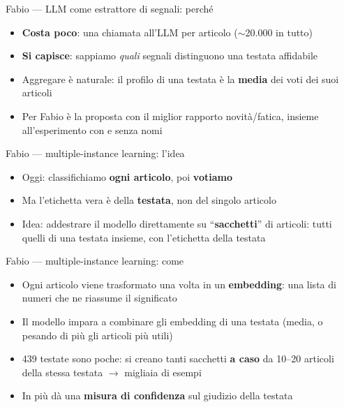\documentclass[aspectratio=169]{beamer}
\newcommand{\hl}[1]{\textbf{#1}}
\begin{document}
\begin{frame}{Fabio --- LLM come estrattore di segnali: perch\'e}
  \vfill
  \begin{itemize}[<+->]
    \setlength\itemsep{0.8em}
    \item \hl{Costa poco}: una chiamata all'LLM per articolo ($\sim$20.000 in tutto)
    \item \hl{Si capisce}: sappiamo \emph{quali} segnali distinguono una testata affidabile
    \item Aggregare \`e naturale: il profilo di una testata \`e la \hl{media} dei voti dei suoi articoli
    \item Per Fabio \`e la proposta con il miglior rapporto novit\`a/fatica, insieme all'esperimento con e senza nomi
  \end{itemize}
  \vfill
\end{frame}

\begin{frame}{Fabio --- multiple-instance learning: l'idea}
  \vfill
  \begin{itemize}[<+->]
    \setlength\itemsep{0.8em}
    \item Oggi: classifichiamo \hl{ogni articolo}, poi \hl{votiamo}
    \item Ma l'etichetta vera \`e della \hl{testata}, non del singolo articolo
    \item Idea: addestrare il modello direttamente su ``\hl{sacchetti}'' di articoli: tutti quelli di una testata insieme, con l'etichetta della testata
  \end{itemize}
  \vfill
\end{frame}

\begin{frame}{Fabio --- multiple-instance learning: come}
  \vfill
  \begin{itemize}[<+->]
    \setlength\itemsep{0.8em}
    \item Ogni articolo viene trasformato una volta in un \hl{embedding}: una lista di numeri che ne riassume il significato
    \item Il modello impara a combinare gli embedding di una testata (media, o pesando di pi\`u gli articoli pi\`u utili)
    \item 439 testate sono poche: si creano tanti sacchetti \hl{a caso} da 10--20 articoli della stessa testata $\rightarrow$ migliaia di esempi
    \item In pi\`u d\`a una \hl{misura di confidenza} sul giudizio della testata
  \end{itemize}
  \vfill
\end{frame}
\end{document}
